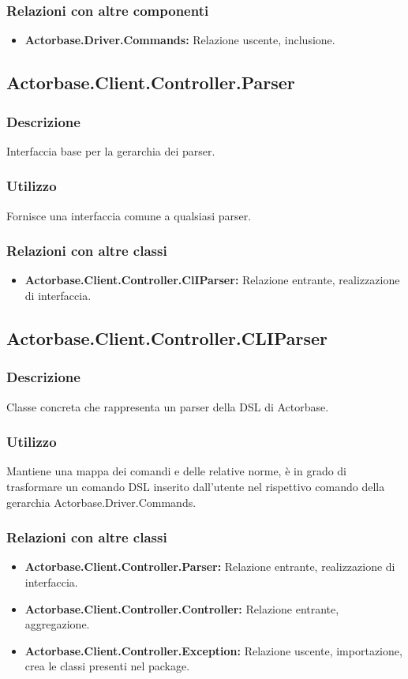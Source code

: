 \documentclass[a4paper]{article}
\begin{document}
			\subsubsection{Relazioni con altre componenti}
				\begin{itemize}
					\item \textbf{Actorbase.Driver.Commands:} Relazione uscente, inclusione.
				\end{itemize}								
					
		\subsection{Actorbase.Client.Controller.Parser}
			\subsubsection{Descrizione}
				Interfaccia base per la gerarchia dei parser.
			\subsubsection{Utilizzo}
				Fornisce una interfaccia comune a qualsiasi parser.
			\subsubsection{Relazioni con altre classi}
				\begin{itemize}
					\item \textbf{Actorbase.Client.Controller.ClIParser:} Relazione entrante, realizzazione di interfaccia.
				\end{itemize}
		
		\subsection{Actorbase.Client.Controller.CLIParser}
			\subsubsection{Descrizione}
				Classe concreta che rappresenta un parser della DSL di Actorbase.
			\subsubsection{Utilizzo}
				Mantiene una mappa dei comandi e delle relative norme, è in grado di trasformare un comando DSL inserito dall'utente nel rispettivo comando della gerarchia Actorbase.Driver.Commands.
			\subsubsection{Relazioni con altre classi}
				\begin{itemize}
					\item \textbf{Actorbase.Client.Controller.Parser:} Relazione entrante, realizzazione di interfaccia.
					\item \textbf{Actorbase.Client.Controller.Controller:} Relazione entrante, aggregazione.
					\item \textbf{Actorbase.Client.Controller.Exception:} Relazione uscente, importazione, crea le classi presenti nel package.
				\end{itemize}
				
\end{document}
